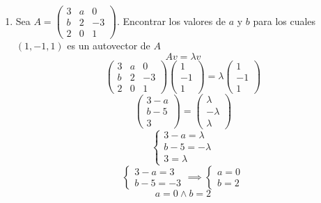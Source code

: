 \documentclass[../practica.root.tex]{subfiles}
\begin{document}
\begin{enumerate}
    \item Sea $A = \begin{pmatrix}
                  3 & a & 0 \\ b & 2 & -3 \\ 2 & 0 & 1
              \end{pmatrix}$. Encontrar los valores de $a$ y $b$ para los cuales $(1,-1,1)$ es un autovector de $A$
          \[
              Av = \lambda v
          \] \[
              \begin{pmatrix}
                  3 & a & 0 \\ b & 2 & -3 \\ 2 & 0 & 1
              \end{pmatrix}
              \begin{pmatrix}
                  1 \\ -1 \\ 1
              \end{pmatrix}
              =
              \lambda
              \begin{pmatrix}
                  1 \\ -1 \\ 1
              \end{pmatrix}
          \] \[
              \begin{pmatrix}
                  3 - a \\ b - 5 \\ 3
              \end{pmatrix}
              =
              \begin{pmatrix}
                  \lambda \\ -\lambda \\ \lambda
              \end{pmatrix}
          \] \[
              \begin{cases}
                  3 - a = \lambda  \\
                  b - 5 = -\lambda \\
                  3 = \lambda
              \end{cases}
          \] \[
              \begin{cases}
                  3 - a  = 3 \\
                  b - 5 = - 3
              \end{cases}
              \implies
              \begin{cases}
                  a = 0 \\
                  b = 2
              \end{cases}
          \] \[
              \boxed{a = 0 \land b = 2}
          \]


\end{enumerate}
\end{document}
